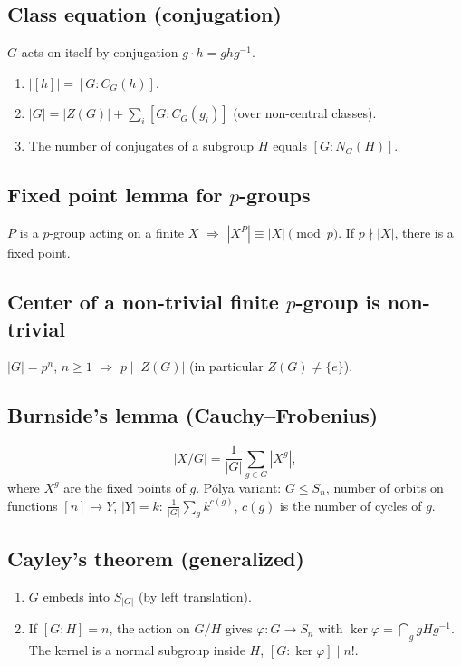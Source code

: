 \subsection{Class equation (conjugation)}
\label{subsec:class-equation}

$G$ acts on itself by conjugation $g\cdot h=ghg^{-1}$.
\begin{enumerate}
\item $|[h]|=[G:C_G(h)]$.
\item $|G|=|Z(G)|+\sum_i[G:C_G(g_i)]$ (over non-central classes).
\item The number of conjugates of a subgroup $H$ equals $[G:N_G(H)]$.
\end{enumerate}

\subsection{Fixed point lemma for $p$-groups}
\label{subsec:pgroup-fixed}

$P$ is a $p$-group acting on a finite $X$ $\Rightarrow$ $|X^P|\equiv|X|\pmod p$. If $p\nmid|X|$, there is a fixed point.

\subsection{Center of a non-trivial finite $p$-group is non-trivial}
\label{subsec:pgroup-center}

$|G|=p^n$, $n\ge1$ $\Rightarrow$ $p\mid|Z(G)|$ (in particular $Z(G)\neq\{e\}$).

\subsection{Burnside's lemma (Cauchy--Frobenius)}
\label{subsec:burnside}

$$|X/G|=\frac1{|G|}\sum_{g\in G}|X^g|,$$
where $X^g$ are the fixed points of $g$. P\'olya variant: $G\le S_n$, number of orbits on functions $[n]\to Y$, $|Y|=k$: $\frac1{|G|}\sum_g k^{c(g)}$, $c(g)$ is the number of cycles of $g$.

\subsection{Cayley's theorem (generalized)}
\label{subsec:cayley}

\begin{enumerate}
\item $G$ embeds into $S_{|G|}$ (by left translation).
\item If $[G:H]=n$, the action on $G/H$ gives $\varphi:G\to S_n$ with $\ker\varphi=\bigcap_{g}gHg^{-1}$. The kernel is a normal subgroup inside $H$, $[G:\ker\varphi]\mid n!$.
\end{enumerate}

